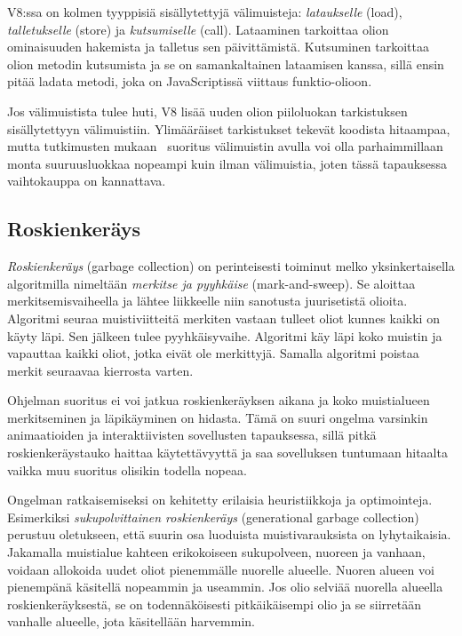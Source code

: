 V8:ssa on kolmen tyyppisiä sisällytettyjä välimuisteja: \textit{lataukselle} (load), \textit{talletukselle} (store) ja \textit{kutsumiselle} (call). Lataaminen tarkoittaa olion ominaisuuden hakemista ja talletus sen päivittämistä. Kutsuminen tarkoittaa olion metodin kutsumista ja se on samankaltainen lataamisen kanssa, sillä ensin pitää ladata metodi, joka on JavaScriptissä viittaus funktio-olioon.

Jos välimuistista tulee huti, V8 lisää uuden olion piiloluokan tarkistuksen sisällytettyyn välimuistiin. Ylimääräiset tarkistukset tekevät koodista hitaampaa, mutta tutkimusten mukaan~\cite[s.~498]{Ahn2014} suoritus välimuistin avulla voi olla parhaimmillaan monta suuruusluokkaa nopeampi kuin ilman välimuistia, joten tässä tapauksessa vaihtokauppa on kannattava.

\subsection{Roskienkeräys}

\textit{Roskienkeräys} (garbage collection) on perinteisesti toiminut melko yksinkertaisella algoritmilla nimeltään \textit{merkitse ja pyyhkäise} (mark-and-sweep). Se aloittaa merkitsemisvaiheella ja lähtee liikkeelle niin sanotusta juurisetistä olioita. Algoritmi seuraa muistiviitteitä merkiten vastaan tulleet oliot kunnes kaikki on käyty läpi. Sen jälkeen tulee pyyhkäisyvaihe. Algoritmi käy läpi koko muistin ja vapauttaa kaikki oliot, jotka eivät ole merkittyjä. Samalla algoritmi poistaa merkit seuraavaa kierrosta varten.

Ohjelman suoritus ei voi jatkua roskienkeräyksen aikana ja koko muistialueen merkitseminen ja läpikäyminen on hidasta. Tämä on suuri ongelma varsinkin animaatioiden ja interaktiivisten sovellusten tapauksessa, sillä pitkä roskienkeräystauko haittaa käytettävyyttä ja saa sovelluksen tuntumaan hitaalta vaikka muu suoritus olisikin todella nopeaa.

Ongelman ratkaisemiseksi on kehitetty erilaisia heuristiikkoja ja optimointeja. Esimerkiksi \textit{sukupolvittainen roskienkeräys} (generational garbage collection)~\cite{v8design} perustuu oletukseen, että suurin osa luoduista muistivarauksista on lyhytaikaisia. Jakamalla muistialue kahteen erikokoiseen sukupolveen, nuoreen ja vanhaan, voidaan allokoida uudet oliot pienemmälle nuorelle alueelle. Nuoren alueen voi pienempänä käsitellä nopeammin ja useammin. Jos olio selviää nuorella alueella roskienkeräyksestä, se on todennäköisesti pitkäikäisempi olio ja se siirretään vanhalle alueelle, jota käsitellään harvemmin.

